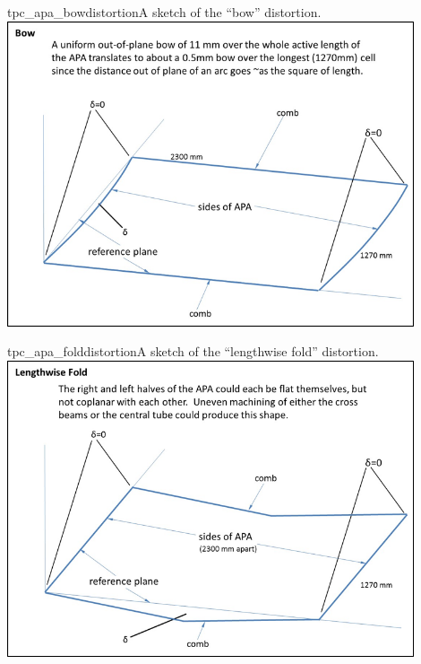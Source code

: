 \begin{cdrfigure}{tpc_apa_bowdistortion}{A sketch of the ``bow'' distortion.}
\includegraphics[width=0.9\textwidth]{figures/tpc_apa_bowdistortion.png} 
\end{cdrfigure}

\begin{cdrfigure}{tpc_apa_folddistortion}{A sketch of the ``lengthwise fold'' distortion.}
\includegraphics[width=0.9\textwidth]{figures/tpc_apa_folddistortion.png} 
\end{cdrfigure}


